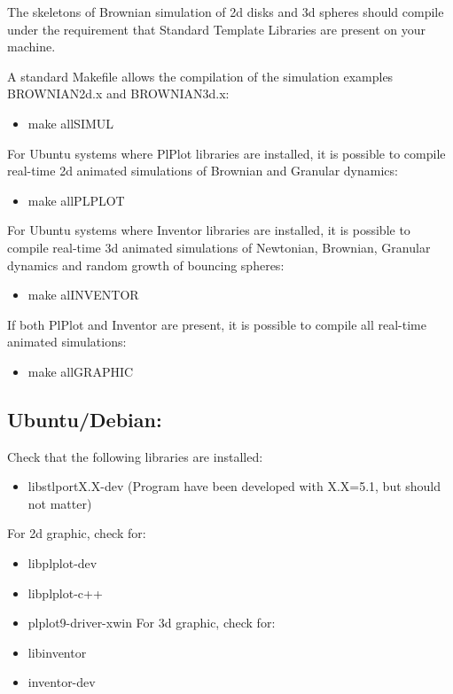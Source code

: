 The skeletons of Brownian simulation of 2d disks and 3d spheres should compile under the requirement that Standard Template Libraries are present on your machine.

A standard Makefile allows the compilation of the simulation examples BROWNIAN2d.x and BROWNIAN3d.x:\begin{itemize}
\item make allSIMUL\end{itemize}


For Ubuntu systems where PlPlot libraries are installed, it is possible to compile real-time 2d animated simulations of Brownian and Granular dynamics:\begin{itemize}
\item make allPLPLOT\end{itemize}


For Ubuntu systems where Inventor libraries are installed, it is possible to compile real-time 3d animated simulations of Newtonian, Brownian, Granular dynamics and random growth of bouncing spheres:\begin{itemize}
\item make alINVENTOR\end{itemize}


If both PlPlot and Inventor are present, it is possible to compile all real-time animated simulations:\begin{itemize}
\item make allGRAPHIC\end{itemize}
\hypertarget{index_compile_ubuntu}{}\subsection{Ubuntu/Debian:}\label{index_compile_ubuntu}
Check that the following libraries are installed:\begin{itemize}
\item libstlportX.X-dev (Program have been developed with X.X=5.1, but should not matter)\end{itemize}


For 2d graphic, check for:\begin{itemize}
\item libplplot-dev\item libplplot-c++\item plplot9-driver-xwin For 3d graphic, check for:\item libinventor\item inventor-dev\end{itemize}



